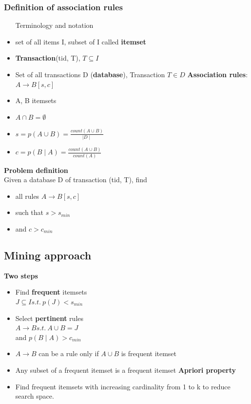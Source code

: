 \subsubsection{Definition of association rules}
\begin{itemize}
\item [Terminology and notation]
\item set of all items I, subset of I called \textbf{itemset}
\item \textbf{Transaction}(tid, T), $ T \subseteq I $
\item Set of all transactions D (\textbf{database}), Transaction $ T
  \in D $
  \textbf{Association rules}: $ A \rightarrow B[s, c] $
\item A, B itemsets
\item $ A \cap B = \emptyset $
\item $ s = p(A \cup B) = \frac{count(A \cup B)}{\mid D \mid} $
\item $ c =  p(B \mid A) = \frac{count(A \cup B)}{count(A)} $
\end{itemize}

\textbf{Problem definition} \\
Given a database D of transaction (tid, T), find \\
\begin{itemize}
\item all rules $ A \rightarrow B[s, c] $
\item such that $ s > s_{min} $
\item and $ c > c_{min} $

\end{itemize}

\subsection{Mining approach}
\textbf{Two steps}
\begin{itemize}
\item Find \textbf{frequent} itemsets \\
  \quad $ J \subseteq I s.t.\ p(J) < s_{min} $
\item Select \textbf{pertinent} rules \\
  \quad $ A \rightarrow B s.t.\ A \cup B = J $ \\
  \quad and $ p(B \mid A) > c_{min} $
\item $ A \rightarrow B $ can be a rule only if $ A \cup B $ is
  frequent itemset
\item Any subset of a frequent itemset is a frequent itemset
  \textbf{Apriori property}
\item Find frequent itemsets with increasing cardinality from 1 to k
  to reduce search space.
\end{itemize}

